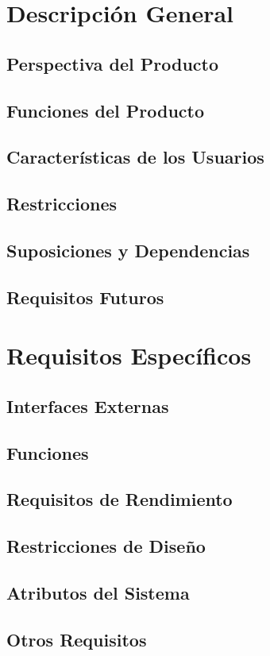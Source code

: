 \documentclass[12pt,a4paper]{article}
\begin{document}
\section{Descripción General}
\subsection{Perspectiva del Producto}
\subsection{Funciones del Producto}
\subsection{Características de los Usuarios}
\subsection{Restricciones}
\subsection{Suposiciones y Dependencias}
\subsection{Requisitos Futuros}
\section{Requisitos Específicos}
\subsection{Interfaces Externas}
\subsection{Funciones}
\subsection{Requisitos de Rendimiento}
\subsection{Restricciones de Diseño}
\subsection{Atributos del Sistema}
\subsection{Otros Requisitos}
\end{document}
